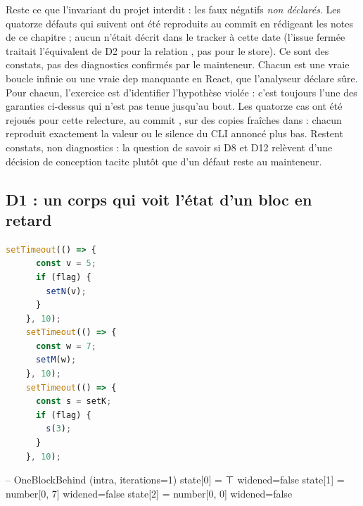Reste ce que l'invariant du projet interdit : les faux négatifs
\emph{non déclarés}. Les quatorze défauts qui suivent ont été reproduits au
commit \snapshotCommit{} en rédigeant les notes de ce chapitre ; aucun
n'était décrit dans le tracker à cette date (l'issue fermée 
traitait l'équivalent de D2 pour la relation , pas
pour le store). Ce sont des constats, pas des diagnostics confirmés par le
mainteneur. Chacun est une vraie boucle infinie ou une vraie dep manquante
en React, que l'analyseur déclare sûre. Pour chacun, l'exercice est
d'identifier l'hypothèse violée : c'est toujours l'une des garanties
ci-dessus qui n'est pas tenue jusqu'au bout. Les quatorze cas ont été
rejoués pour cette relecture, au commit \snapshotCommit{}, sur des copies
fraîches dans  : chacun reproduit exactement la valeur ou
le silence du CLI annoncé plus bas. Restent constats, non diagnostics : la
question de savoir si D8 et D12 relèvent d'une décision de conception
tacite plutôt que d'un défaut reste au mainteneur.

\subsection{D1 : un corps qui voit l'état d'un bloc en retard}

\begin{lstlisting}[language=TypeScript,caption={Trois callbacks à deux blocs (\file{/tmp/ch11/ex3.tsx}, extrait de l'effet)},label={lst:transfert-stores-d1}]
    setTimeout(() => {
      const v = 5;
      if (flag) {
        setN(v);
      }
    }, 10);
    setTimeout(() => {
      const w = 7;
      setM(w);
    }, 10);
    setTimeout(() => {
      const s = setK;
      if (flag) {
        s(3);
      }
    }, 10);
\end{lstlisting}

\begin{sortie}
-- OneBlockBehind (intra, iterations=1)
   state[0] = ⊤   widened=false
   state[1] = number[0, 7]   widened=false
   state[2] = number[0, 0]   widened=false
\end{sortie}


